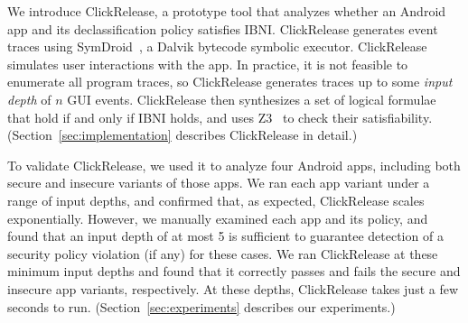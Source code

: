 \documentclass{llncs}
\newcommand{\toolname}{ClickRelease\xspace}
\newcommand{\comment}[3][\color{red}]{{#1{[{#2}: {#3}]}}}
\newcommand{\jeff}[1]{\comment[\color{green}]{JSF}{#1}}
\newcommand{\mrc}[1]{\comment[\color{blue}]{MRC}{#1}}
\newcommand{\rsout}[1]{{\color{blue}\sout{#1}}}
\begin{document}



We introduce \toolname, a prototype tool that analyzes
whether an Android app and its declassification policy
satisfies IBNI.
\toolname generates event traces using SymDroid~\cite{Jeon:2012}, a
Dalvik bytecode symbolic executor.  \toolname
simulates user interactions with the app.
In practice, it is not feasible to
enumerate all program traces, so \toolname generates traces up to some
\emph{input depth} of $n$ GUI events.  
\toolname{} then synthesizes a
set of logical formulae that hold if and only if IBNI holds, and uses
Z3~\cite{deMoura:2008} to check their satisfiability.
(Section~\ref{sec:implementation} describes \toolname in detail.)


To validate \toolname, we used it to analyze four Android apps,
including both secure and insecure variants of those apps.
We ran each app variant under a range of input depths, and confirmed
that, as expected, \toolname{} scales exponentially.
However, we manually examined each app and its policy, and
found that an input depth of at most 5 is sufficient to
guarantee detection of a security policy violation (if any) for these
cases.  We ran \toolname{} at these minimum input depths and found
that it correctly passes and fails the secure and insecure app
variants, respectively. At these depths, \toolname{} takes just a few
seconds to run. (Section~\ref{sec:experiments} describes our experiments.)
\end{document}

